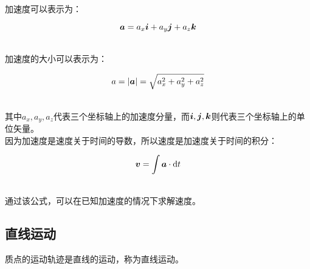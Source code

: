 \documentclass[UTF8]{ctexart}
\newcommand*{\veb}[1]{\vb*{#1}}
\newcommand*{\dif}{\mathop{}\!\mathrm{d}}
\begin{document}
    加速度可以表示为：
    \begin{large}
        \begin{equation*}
            \veb{a}=a_x\veb{i}+a_y\veb{j}+a_z\veb{k}
        \end{equation*}
    \end{large}\\
    加速度的大小可以表示为：
    \begin{large}
        \begin{equation*}
            a=|\veb{a}|=\sqrt{a_x^2+a_y^2+a_z^2}
        \end{equation*}
    \end{large}\\
    其中$a_x,a_y,a_z$代表三个坐标轴上的加速度分量，而$\veb{i},\veb{j},\veb{k}$则代表三个坐标轴上的单位矢量。\\[6mm]
    因为加速度是速度关于时间的导数，所以速度是加速度关于时间的积分：\vspace{5pt}
    \begin{large}
        \begin{equation*}
            \veb{v}=\int \veb{a}\cdot\dif t
        \end{equation*}
    \end{large}\\
    通过该公式，可以在已知加速度的情况下求解速度。

\newpage

\subsection{直线运动}
    质点的运动轨迹是直线的运动，称为直线运动。
\end{document}
